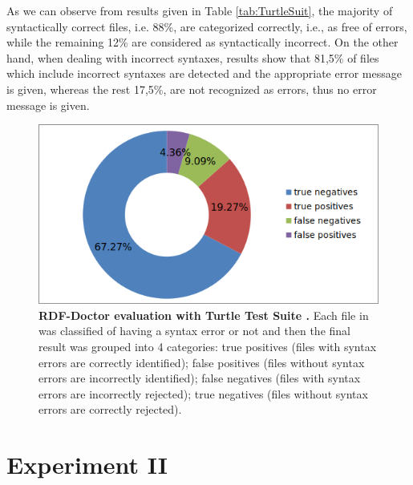 As we can observe from results given in Table \ref{tab:TurtleSuit}, the majority of syntactically correct files, i.e. 88\%, are categorized correctly, i.e., as free of errors, while the remaining 12\% are considered as syntactically incorrect.
On the other hand, when dealing with incorrect syntaxes, results show that 81,5\% of files which include incorrect syntaxes are detected and the appropriate error message is given, whereas the rest 17,5\%, are not recognized as errors, thus no error message is given.
\begin{figure}
\begin{center}
		\includegraphics[scale=0.6,angle=0,trim=4 4 4 4,clip]{images/Experiment01.png}
		\caption{\textbf{RDF-Doctor evaluation with Turtle Test Suite \cite{TurtleTests:Online}.} Each file in \cite{TurtleTests:Online} was classified of having a syntax error or not and then the final result was grouped into 4 categories: true positives (files with syntax errors are correctly identified); false positives (files without syntax errors are incorrectly identified); false negatives (files with syntax errors are incorrectly rejected); true negatives (files without syntax errors are correctly rejected).}
		\label{Fig:Experiment01}
\end{center}
\end{figure}


\section{Experiment II}

